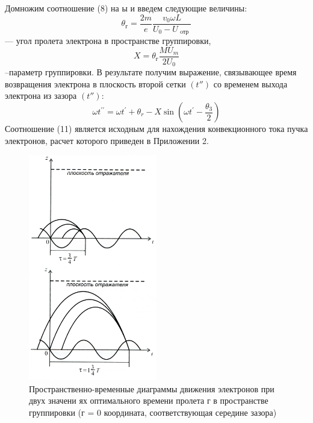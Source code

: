 Домножим соотношение (8) на ы и введем следующие величины:
\begin{equation}
	\theta _ { \text{г} } = \frac { 2 m } { e } \frac { v _ { 0 } \omega L } { U _ { 0 } - U _ { \text{ oтр } } }
\end{equation}— угол пролета электрона в пространстве группировки,
\begin{equation}
	X = \theta _ { \text{г} } \frac{M U _ { m } } { 2 U _ { 0 } }
\end{equation}--параметр группировки. В результате получим выражение, связывающее
время возвращения электрона в плоскость второй сетки $(t'' )$ со временем
выхода электрона из зазора $(t'')$:
\begin{equation}
	\omega t ^ { \prime \prime } = \omega t ^ { \prime } + \theta _ { r } - X \sin \left( \omega t ^ { \prime } - \frac { \theta _ { 3 } } { 2 } \right)
\end{equation}
Соотношение (11) является исходным для нахождения конвекционного
тока пучка электронов, расчет которого приведен в Приложении 2.

\begin{figure}[h!]
	\centering
	\includegraphics[width=0.5\textwidth]{fig/fig3}
	\caption{Пространственно-временные диаграммы движения электронов при двух значени­
ях оптимального времени пролета г в пространстве группировки (г = 0 координата,
соответствующая середине зазора)}
	\label{fig:potential_well}
\end{figure}


